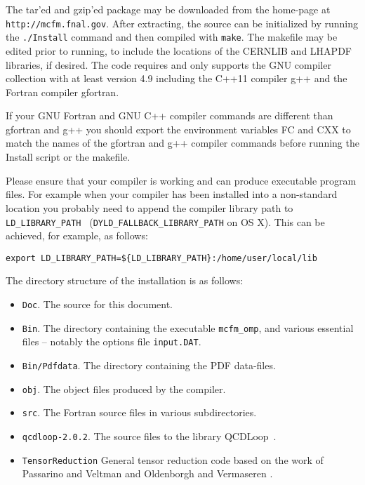 \documentclass{article}
\begin{document}
The tar'ed and gzip'ed package may be downloaded from
the \MCFM home-page at {\tt http://mcfm.fnal.gov}.
After extracting, the source can be initialized by running the
{\tt ./Install} command and then compiled with {\tt make}. The
makefile may be edited prior to running, to include
the locations of the CERNLIB and LHAPDF libraries, if desired.
The code requires and only supports the GNU compiler collection with at least
version 4.9 including the C++11 compiler g++ and the Fortran compiler gfortran.

If your GNU Fortran and GNU C++ compiler commands are different than gfortran
and g++ you should export the environment variables FC and CXX to match the
names of the gfortran and g++ compiler commands before running the Install
script or the makefile.

Please ensure that your compiler is working and can produce executable program
files. For example when your compiler has been installed into a non-standard
location you probably need to append the compiler library path to {\tt
LD\_LIBRARY\_PATH } ({\tt DYLD\_FALLBACK\_LIBRARY\_PATH} on OS X).  This can be
achieved, for example, as follows:
\begin{verbatim}
export LD_LIBRARY_PATH=${LD_LIBRARY_PATH}:/home/user/local/lib
\end{verbatim}


The directory structure of the installation is as follows:
\begin{itemize}
\item {\tt Doc}. The source for this document.
\item {\tt Bin}. The directory containing the executable {\tt mcfm\_omp},
and various essential files -- notably the options file {\tt input.DAT}.
\item {\tt Bin/Pdfdata}. The directory containing the PDF data-files.
\item {\tt obj}. The object files produced by the compiler. 
\item {\tt src}. The Fortran source files in various subdirectories.
\item {\tt qcdloop-2.0.2}. The source files to the
library QCDLoop~\cite{Carrazza:2016gav,Ellis:2007qk}.
\item {\tt TensorReduction} General tensor reduction code based on the work of Passarino and 
Veltman \cite{Passarino:1978jh} and Oldenborgh and Vermaseren \cite{vanOldenborgh:1989wn}.
\end{itemize}
 
\end{document}
